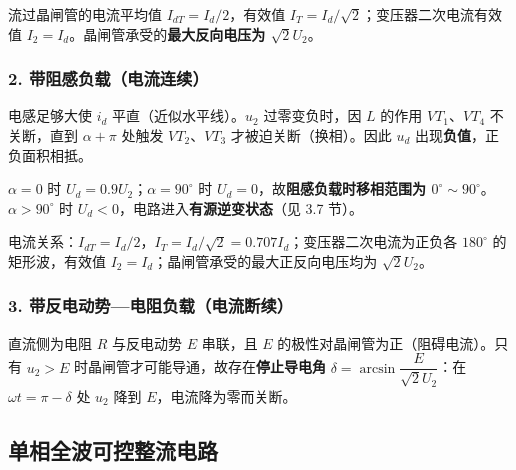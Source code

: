 流过晶闸管的电流平均值 $I_{dT}=I_d/2$，有效值 $I_T=I_d/\sqrt{2}$；变压器二次电流有效值 $I_2=I_d$。晶闸管承受的\textbf{最大反向电压为 $\sqrt{2}U_2$}。

\subsubsection*{2. 带阻感负载（电流连续）}

电感足够大使 $i_d$ 平直（近似水平线）。$u_2$ 过零变负时，因 $L$ 的作用 $VT_1$、$VT_4$ 不关断，直到 $\alpha+\pi$ 处触发 $VT_2$、$VT_3$ 才被迫关断（换相）。因此 $u_d$ 出现\textbf{负值}，正负面积相抵。


$\alpha=0$ 时 $U_d=0.9U_2$；$\alpha=90^\circ$ 时 $U_d=0$，故\textbf{阻感负载时移相范围为 $0^\circ\sim90^\circ$}。$\alpha>90^\circ$ 时 $U_d<0$，电路进入\textbf{有源逆变状态}（见 3.7 节）。

电流关系：$I_{dT}=I_d/2$，$I_T=I_d/\sqrt{2}=0.707I_d$；变压器二次电流为正负各 $180^\circ$ 的矩形波，有效值 $I_2=I_d$；晶闸管承受的最大正反向电压均为 $\sqrt{2}U_2$。

\subsubsection*{3. 带反电动势—电阻负载（电流断续）}

直流侧为电阻 $R$ 与反电动势 $E$ 串联，且 $E$ 的极性对晶闸管为正（阻碍电流）。只有 $u_2>E$ 时晶闸管才可能导通，故存在\textbf{停止导电角} $\delta=\arcsin\dfrac{E}{\sqrt{2}U_2}$：在 $\omega t=\pi-\delta$ 处 $u_2$ 降到 $E$，电流降为零而关断。



\subsection{单相全波可控整流电路}

